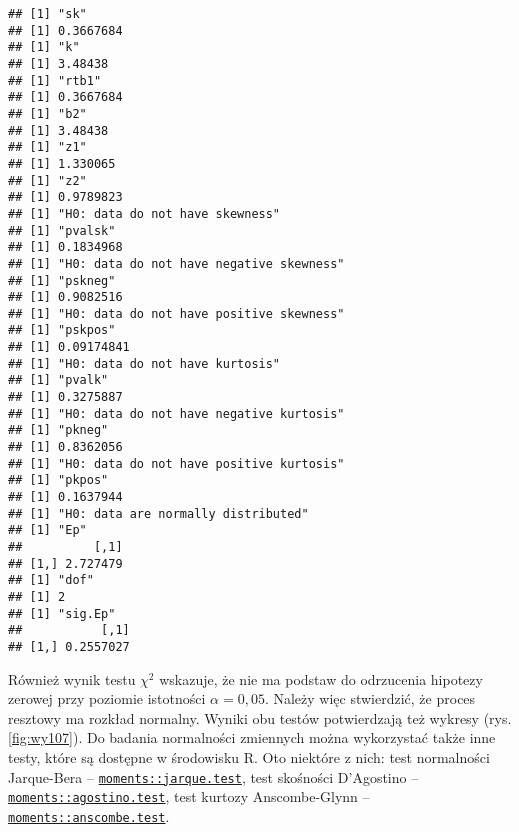 \documentclass[polish,]{book}
\begin{document}
\begin{verbatim}
## [1] "sk"
## [1] 0.3667684
## [1] "k"
## [1] 3.48438
## [1] "rtb1"
## [1] 0.3667684
## [1] "b2"
## [1] 3.48438
## [1] "z1"
## [1] 1.330065
## [1] "z2"
## [1] 0.9789823
## [1] "H0: data do not have skewness"
## [1] "pvalsk"
## [1] 0.1834968
## [1] "H0: data do not have negative skewness"
## [1] "pskneg"
## [1] 0.9082516
## [1] "H0: data do not have positive skewness"
## [1] "pskpos"
## [1] 0.09174841
## [1] "H0: data do not have kurtosis"
## [1] "pvalk"
## [1] 0.3275887
## [1] "H0: data do not have negative kurtosis"
## [1] "pkneg"
## [1] 0.8362056
## [1] "H0: data do not have positive kurtosis"
## [1] "pkpos"
## [1] 0.1637944
## [1] "H0: data are normally distributed"
## [1] "Ep"
##          [,1]
## [1,] 2.727479
## [1] "dof"
## [1] 2
## [1] "sig.Ep"
##           [,1]
## [1,] 0.2557027
\end{verbatim}

Również wynik testu \(\chi^2\) wskazuje, że nie ma podstaw do odrzucenia hipotezy zerowej
przy poziomie istotności \(\alpha = 0,05\). Należy więc stwierdzić, że proces resztowy ma
rozkład normalny. Wyniki obu testów potwierdzają też wykresy (rys. \ref{fig:wy107}).
Do badania normalności zmiennych można wykorzystać także inne testy, które
są dostępne w środowisku R. Oto niektóre z nich: test
normalności Jarque-Bera -- \href{https://rdrr.io/cran/moments/man/jarque.test.html}{\texttt{moments::jarque.test}}, test skośności D'Agostino -- \href{https://rdrr.io/cran/moments/man/agostino.test.html}{\texttt{moments::agostino.test}}, test kurtozy Anscombe-Glynn -- \href{https://rdrr.io/cran/moments/man/anscombe.test.html}{\texttt{moments::anscombe.test}}.
\end{document}
